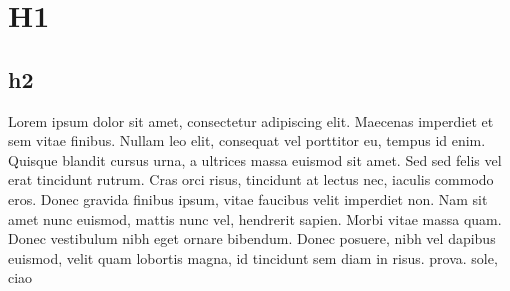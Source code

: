 \section{H1}
\subsection{h2}
Lorem ipsum dolor sit amet, consectetur adipiscing elit. Maecenas imperdiet et sem vitae finibus. Nullam leo elit, consequat vel porttitor eu, tempus id enim. Quisque blandit cursus urna, a ultrices massa euismod sit amet. Sed sed felis vel erat tincidunt rutrum. Cras orci risus, tincidunt at lectus nec, iaculis commodo eros. Donec gravida finibus ipsum, vitae faucibus velit imperdiet non. Nam sit amet nunc euismod, mattis nunc vel, hendrerit sapien. Morbi vitae massa quam. Donec vestibulum nibh eget ornare bibendum. Donec posuere, nibh vel dapibus euismod, velit quam lobortis magna, id tincidunt sem diam in risus. prova. sole, ciao
